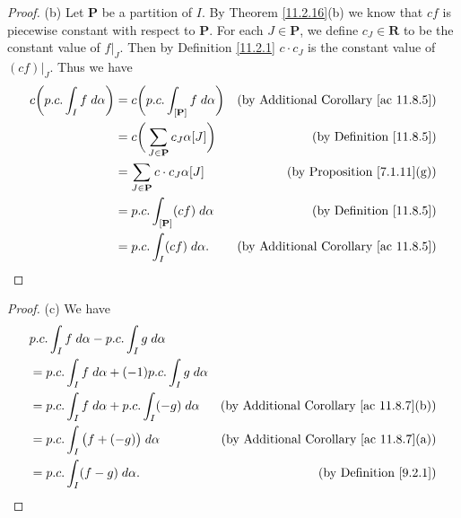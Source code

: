 \begin{proof}{(b)}
    Let \(\mathbf{P}\) be a partition of \(I\).
    By Theorem \ref{11.2.16}(b) we know that \(cf\) is piecewise constant with respect to \(\mathbf{P}\).
    For each \(J \in \mathbf{P}\), we define \(c_J \in \mathbf{R}\) to be the constant value of \(f|_J\).
    Then by Definition \ref{11.2.1} \(c \cdot c_J\) is the constant value of \((cf)|_J\).
    Thus we have
    \begin{align*}
        c \bigg(p.c. \int_I f \; d \alpha\bigg) & = c \bigg(p.c. \int_{[\mathbf{P}]} f \; d \alpha\bigg) & \text{(by Additional Corollary \ref{ac 11.8.5})} \\
                                                & = c \bigg(\sum_{J \in \mathbf{P}} c_J \alpha[J]\bigg)  & \text{(by Definition \ref{11.8.5})}              \\
                                                & = \sum_{J \in \mathbf{P}} c \cdot c_J \alpha[J]        & \text{(by Proposition \ref{7.1.11}(g))}          \\
                                                & = p.c. \int_{[\mathbf{P}]} (c f) \; d \alpha           & \text{(by Definition \ref{11.8.5})}              \\
                                                & = p.c. \int_I (c f) \; d \alpha.                       & \text{(by Additional Corollary \ref{ac 11.8.5})}
    \end{align*}
\end{proof}

\begin{proof}{(c)}
    We have
    \begin{align*}
         & p.c. \int_I f \; d \alpha - p.c. \int_I g \; d \alpha                                                              \\
         & = p.c. \int_I f \; d \alpha + (-1) p.c. \int_I g \; d \alpha                                                       \\
         & = p.c. \int_I f \; d \alpha + p.c. \int_I (-g) \; d \alpha   & \text{(by Additional Corollary \ref{ac 11.8.7}(b))} \\
         & = p.c. \int_I \big(f + (-g)\big) \; d \alpha                 & \text{(by Additional Corollary \ref{ac 11.8.7}(a))} \\
         & = p.c. \int_I (f - g) \; d \alpha.                           & \text{(by Definition \ref{9.2.1})}
    \end{align*}
\end{proof}


